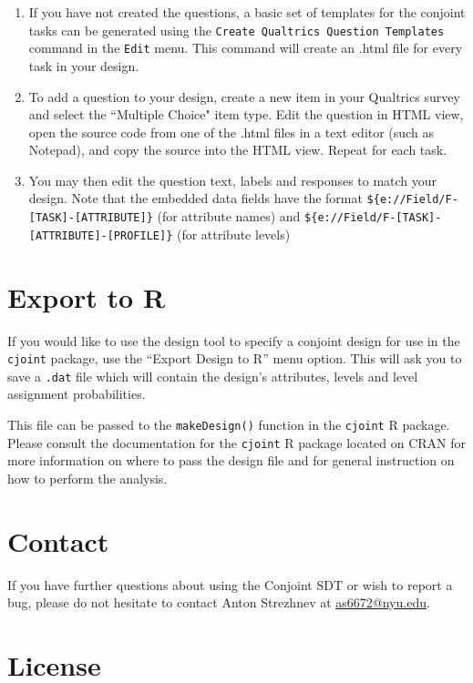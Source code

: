 \documentclass[12pt]{article}
\begin{document}
\begin{enumerate}
\item If you have not created the questions, a basic set of templates for the conjoint tasks can be generated using the \texttt{Create Qualtrics Question Templates} command in the \texttt{Edit} menu. This command will create an .html file for every task in your design.
\item To add a question to your design, create a new item in your Qualtrics survey and select the ``Multiple Choice" item type. Edit the question in HTML view, open the source code from one of the .html files in a text editor (such as Notepad), and copy the source into the HTML view. Repeat for each task.
\item You may then edit the question text, labels and responses to match your design. Note that the embedded data fields have the format \texttt{\$\{e://Field/F-[TASK]-[ATTRIBUTE]\}} (for attribute names) and \texttt{\$\{e://Field/F-[TASK]-[ATTRIBUTE]-[PROFILE]\}} (for attribute levels)

\end{enumerate}

\section{Export to R}

If you would like to use the design tool to specify a conjoint design for use in the \texttt{cjoint} package, use the ``Export Design to R'' menu option. This will ask you to save a \texttt{.dat} file which will contain the design's attributes, levels and level assignment probabilities. 

This file can be passed to the \texttt{makeDesign()} function in the \texttt{cjoint} R package. Please consult the documentation for the \texttt{cjoint} R package located on CRAN for more information on where to pass the design file and for general instruction on how to perform the analysis.

\section{Contact}

If you have further questions about using the Conjoint SDT or wish to report a bug, please do not hesitate to contact Anton Strezhnev at \href{mailto:as6672@nyu.edu}{as6672@nyu.edu}.

\section{License}
\end{document}
